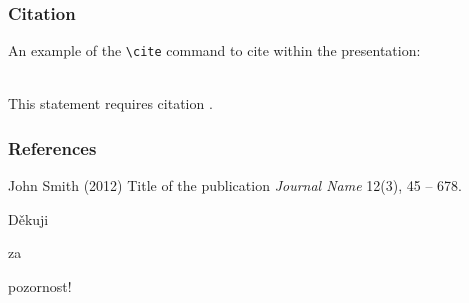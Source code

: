 \documentclass[mathserif]{beamer}
\begin{document}

\begin{frame}[fragile] %
\frametitle{Citation}
An example of the \verb|\cite| command to cite within the presentation:\\~

This statement requires citation \cite{p1}.
\end{frame}


\begin{frame}
\frametitle{References}
\footnotesize{
\begin{thebibliography}{99} %
 John Smith (2012)
\newblock Title of the publication
\newblock \emph{Journal Name} 12(3), 45 -- 678.
\end{thebibliography}
}
\end{frame}


\begin{frame}
\Huge{\centerline{Děkuji}}
\Huge{\centerline{za}}
\Huge{\centerline{pozornost!}}
\end{frame}

\end{document}
